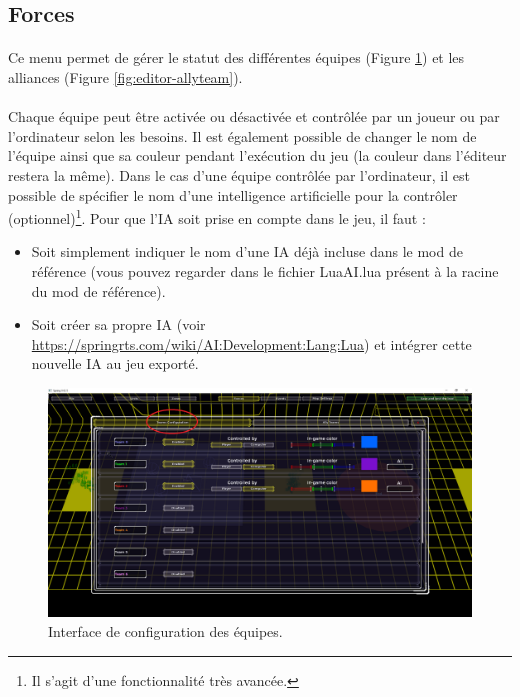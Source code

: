 \documentclass[a4paper]{article}
\begin{document}
\subsection{Forces}
\paragraph{ }
Ce menu permet de gérer le statut des différentes équipes (Figure \ref{fig:editor-teamconfig}) et les alliances (Figure \ref{fig:editor-allyteam}).
\paragraph{ }
Chaque équipe peut être activée ou désactivée et contrôlée par un joueur ou par l'ordinateur selon les besoins. Il est également possible de changer le nom de l'équipe ainsi que sa couleur pendant l'exécution du jeu (la couleur dans l'éditeur restera la même). Dans le cas d'une équipe contrôlée par l'ordinateur, il est possible de spécifier le nom d'une intelligence artificielle pour la contrôler (optionnel)\footnote{Il s'agit d'une fonctionnalité très avancée.}. Pour que l'IA soit prise en compte dans le jeu, il faut :
\begin{itemize}
\item Soit simplement indiquer le nom d'une IA déjà incluse dans le mod de référence (vous pouvez regarder dans le fichier LuaAI.lua présent à la racine du mod de référence).
\item Soit créer sa propre IA (voir \url{https://springrts.com/wiki/AI:Development:Lang:Lua}) et intégrer cette nouvelle IA au jeu exporté.
\end{itemize}
\begin{figure}[H]
\centering
\includegraphics[width=\linewidth]{editor-teamconfig.png}
\caption{Interface de configuration des équipes.}
\label{fig:editor-teamconfig}
\end{figure}
\end{document}
